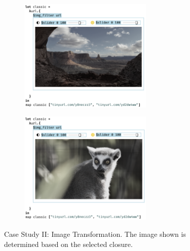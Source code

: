 \begin{figure}
  \begin{center}
    \begin{subfigure}[t]{0.5\textwidth}
      \centering
      \includegraphics[width=15pc]{img-filter-1.png}
      \caption{}
    \end{subfigure}\begin{subfigure}[t]{0.5\textwidth}
      \centering
      \includegraphics[width=15pc]{img-filter-2.png}
      \caption{}
    \end{subfigure}
  \end{center}
  \caption{Case Study II: Image Transformation. The image shown is determined based on the selected closure.}
  \label{fig:img-transformation}
\end{figure}


